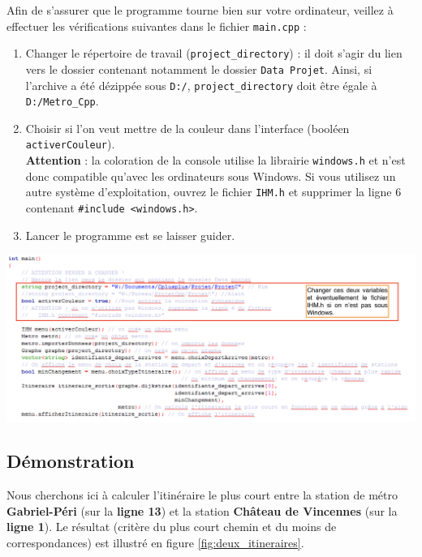 \documentclass[,french]{article}
\begin{document}
Afin de s'assurer que le programme tourne bien sur votre ordinateur,
veillez à effectuer les vérifications suivantes dans le fichier
\texttt{main.cpp} :

\begin{enumerate}
\def\labelenumi{\arabic{enumi}.}
\item
  Changer le répertoire de travail (\texttt{project\_directory}) : il
  doit s'agir du lien vers le dossier contenant notamment le dossier
  \texttt{Data\ Projet}. Ainsi, si l'archive a été dézippée sous
  \texttt{D:/}, \texttt{project\_directory} doit être égale à
  \texttt{D:/Metro\_Cpp}.
\item
  Choisir si l'on veut mettre de la couleur dans l'interface (booléen
  \texttt{activerCouleur}).\\
  \bcattention  \textbf{Attention} : la coloration de la console utilise
  la librairie \texttt{windows.h} et n'est donc compatible qu'avec les
  ordinateurs sous Windows. Si vous utilisez un autre système
  d'exploitation, ouvrez le fichier \texttt{IHM.h} et supprimer la ligne
  6 contenant \texttt{\#include\ \textless{}windows.h\textgreater{}}.
\item
  Lancer le programme est se laisser guider.
\end{enumerate}

\includegraphics{img/main.png}

\hypertarget{duxe9monstration}{%
\subsection{Démonstration}\label{duxe9monstration}}

Nous cherchons ici à calculer l'itinéraire le plus court entre la
station de métro \textbf{Gabriel-Péri} (sur la \textbf{ligne 13}) et la
station \textbf{Château de Vincennes} (sur la \textbf{ligne 1}). Le
résultat (critère du plus court chemin et du moins de correspondances)
est illustré en figure \ref{fig:deux_itineraires}.
\end{document}
